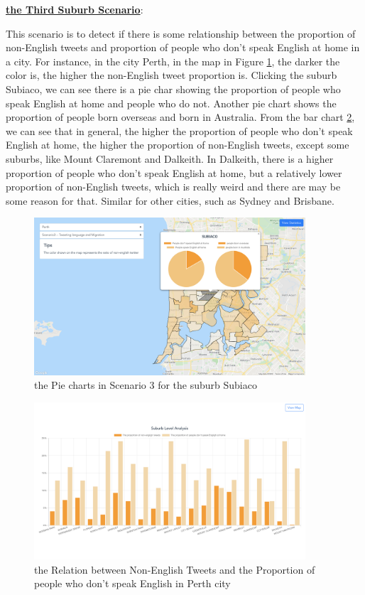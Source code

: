 \documentclass{article}
\begin{document}
\textbf{\underline{the Third Suburb Scenario}}: 

This scenario is to detect if there is some relationship between the proportion  of non-English tweets and proportion of people who don't speak English at home in a city. For instance, in the city Perth, in the map in Figure 
\ref{fig:Perth_pie_chart}, the darker the color is, the higher the non-English tweet proportion is. Clicking the suburb Subiaco, we can see there is a pie char showing the proportion of people who speak English at home and people who do not. Another pie chart shows the proportion of people born overseas and born in Australia. From the bar chart
\ref{fig:Perth_histogram}, we can see that in general, the higher the proportion of people who don’t speak English at home, the higher the proportion of non-English tweets, except some suburbs, like Mount Claremont and Dalkeith. In Dalkeith, there is a higher proportion of people who don’t speak English at home, but a relatively lower proportion of non-English tweets, which is really weird and there are may be some reason for that. Similar for other cities, such as Sydney and Brisbane.

\begin{figure}[htp]
\centering
\includegraphics[width=0.9\textwidth]{img/Perth_pie_chart.jpg}
\caption{the Pie charts in Scenario 3 for the suburb Subiaco}
\label{fig:Perth_pie_chart}
\end{figure}

\begin{figure}[htp]
\centering
\includegraphics[width=0.9\textwidth]{img/Perth_histogram.jpg}
\caption{the Relation between Non-English Tweets and the Proportion of people who don't speak English in Perth city}
\label{fig:Perth_histogram}
\end{figure}
\end{document}
